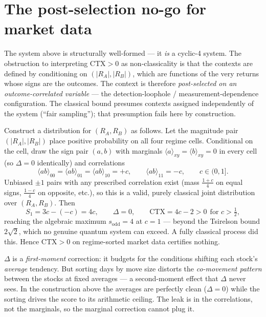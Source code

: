 \documentclass[11pt]{article}
\newcommand{\E}[1]{\langle ab\rangle_{#1}}
\newcommand{\sodd}{s_{\mathrm{odd}}}
\begin{document}
\section{The post-selection no-go for market data}\label{sec:postsel}

The system above is structurally well-formed --- it \emph{is} a cyclic-4 system. The
obstruction to interpreting $\mathrm{CTX}>0$ as non-classicality is that the contexts are
defined by conditioning on $(|R_{A}|,|R_{B}|)$, which are functions of the very returns whose
signs are the outcomes. The context is therefore \emph{post-selected on an outcome-correlated
variable} --- the detection-loophole / measurement-dependence configuration. The classical
bound presumes contexts assigned independently of the system (``fair sampling''); that
presumption fails here by construction.

\begin{derivationbox}[A classical joint that reaches $\mathrm{CTX}>0$, indeed $\sodd=4$]
Construct a distribution for $(R_A,R_B)$ as follows. Let the magnitude pair
$(|R_A|,|R_B|)$ place positive probability on all four regime cells. Conditional on the cell,
draw the sign pair $(a,b)$ with marginals $\langle a\rangle_{xy}=\langle b\rangle_{xy}=0$ in
every cell (so $\Delta=0$ identically) and correlations
\[
  \E{00}=\E{01}=\E{10}=+c,\qquad \E{11}=-c,\qquad c\in(0,1].
\]
Unbiased $\pm1$ pairs with any prescribed correlation exist (mass
$\tfrac{1+c}{4}$ on equal signs, $\tfrac{1-c}{4}$ on opposite, etc.), so this is a valid,
purely classical joint distribution over $(R_A,R_B)$. Then
\[
  S_1=3c-(-c)=4c,\qquad \Delta=0,\qquad \mathrm{CTX}=4c-2>0\ \ \text{for } c>\tfrac12,
\]
reaching the algebraic maximum $\sodd=4$ at $c=1$ --- beyond the Tsirelson bound $2\sqrt2$,
which no genuine quantum system can exceed. A fully classical process did this. Hence
$\mathrm{CTX}>0$ on regime-sorted market data certifies nothing.
\end{derivationbox}

\begin{intuition}
$\Delta$ is a \emph{first-moment} correction: it budgets for the conditions shifting each
stock's \emph{average} tendency. But sorting days by move size distorts the
\emph{co-movement pattern} between the stocks at fixed averages --- a second-moment effect
that $\Delta$ never sees. In the construction above the averages are perfectly clean
($\Delta=0$) while the sorting drives the score to its arithmetic ceiling. The leak is in the
correlations, not the marginals, so the marginal correction cannot plug it.
\end{intuition}
\end{document}
